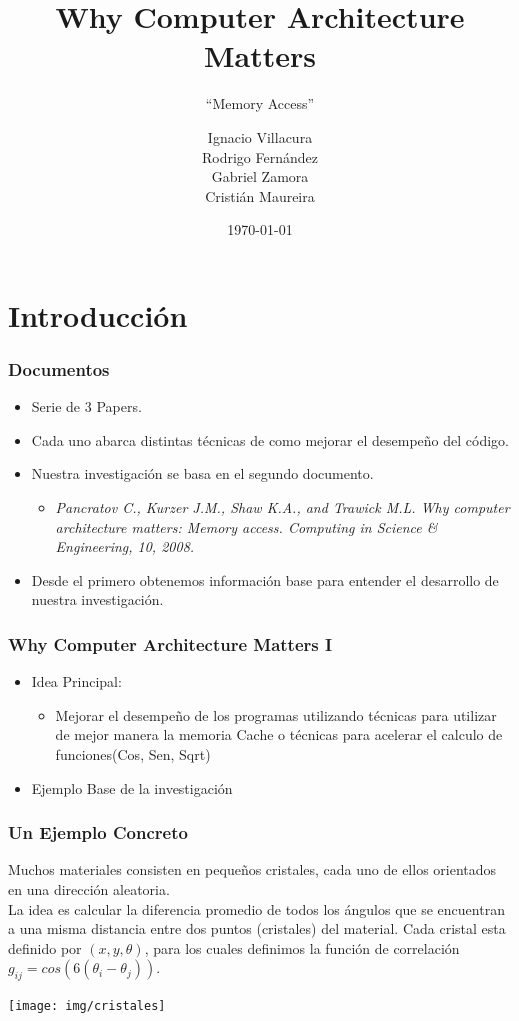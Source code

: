 \documentclass{beamer}
\title{Why Computer Architecture Matters}
\subtitle{``Memory Access''}
\author[I. Villacura/R. Fernández/G. Zamora/C. Maureira/]{Ignacio Villacura\\Rodrigo Fernández\\Gabriel Zamora\\Cristián Maureira}
\date{\today}
\begin{document}
\frame
{
	\titlepage
}

\frame
{
	\tableofcontents
}

\section{Introducción}
\frame
{
\frametitle{Documentos}
 \begin{itemize}
  \item Serie de 3 Papers.
  \item Cada uno abarca distintas técnicas de como mejorar el desempeño del código.
  \item Nuestra investigación se basa en el segundo documento.
\begin{itemize}
\item \textit{Pancratov C., Kurzer J.M., Shaw K.A., and Trawick M.L. Why computer architecture matters: Memory access. Computing in Science \& Engineering, 10, 2008.}
\end{itemize}
  \item Desde el primero obtenemos información base para entender el desarrollo de nuestra investigación.
 \end{itemize}
}

\frame
{
\frametitle{Why Computer Architecture Matters I}
\begin{itemize}
	\item Idea Principal:
	\begin{itemize}
		\item Mejorar el desempeño de los programas utilizando técnicas para utilizar de mejor manera la memoria Cache o técnicas para acelerar el calculo de funciones(Cos, Sen, Sqrt)
	\end{itemize}
	\item Ejemplo Base de la investigación
\end{itemize}
}
\frame
{
\frametitle{Un Ejemplo Concreto}
Muchos materiales consisten en pequeños cristales, cada uno de ellos orientados en una dirección
aleatoria.\\
La idea es calcular la diferencia promedio de todos los ángulos que se encuentran a una misma distancia entre dos
puntos (cristales) del material. Cada cristal esta definido por $(x,y,\theta)$, para los cuales definimos la funci\'on de correlaci\'on
 $g_{ij} = cos(6(\theta_i - \theta_j))$.
\begin{center}
	\texttt{[image: img/cristales]}
\end{center}
}

\end{document}
